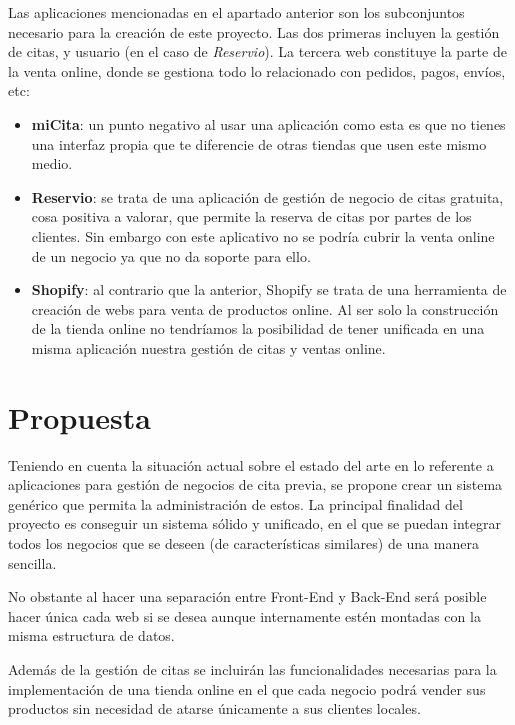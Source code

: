 Las aplicaciones mencionadas en el apartado anterior son los subconjuntos necesario para la creación de este proyecto.
Las dos primeras incluyen la gestión de citas, y usuario (en el caso de \textit{Reservio}). La tercera web constituye
la parte de la venta online, donde se gestiona todo lo relacionado con pedidos, pagos, envíos, etc:

\vspace{-0.5em}

\begin{itemize}
    \item \textbf{miCita}: un punto negativo al usar una aplicación como esta es que no tienes una interfaz propia
    que te diferencie de otras tiendas que usen este mismo medio.

    \item \textbf{Reservio}: se trata de una aplicación de gestión de negocio de citas gratuita, cosa positiva a
    valorar, que permite la reserva de citas por partes de los clientes. Sin embargo con este aplicativo no se
    podría cubrir la venta online de un negocio ya que no da soporte para ello.

    \item \textbf{Shopify}: al contrario que la anterior, Shopify se trata de una herramienta de creación de webs
    para venta de productos online. Al ser solo la construcción de la tienda online no tendríamos la posibilidad de
    tener unificada en una misma aplicación nuestra gestión de citas y ventas online.
\end{itemize}

\section{Propuesta}
Teniendo en cuenta la situación actual sobre el estado del arte en lo referente a aplicaciones para
gestión de negocios de cita previa, se propone crear un sistema genérico que permita la administración
de estos. La principal finalidad del proyecto es conseguir un sistema sólido y unificado, en el que se
puedan integrar todos los negocios que se deseen (de características similares) de una manera sencilla.

No obstante al hacer una separación entre Front-End y Back-End será posible hacer única cada web si se
desea aunque internamente estén montadas con la misma estructura de datos.

Además de la gestión de citas se incluirán las funcionalidades necesarias para la implementación de una
tienda online en el que cada negocio podrá vender sus productos sin necesidad de atarse únicamente
a sus clientes locales.

